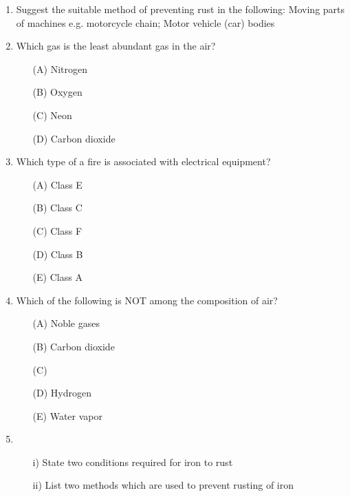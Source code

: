 \begin{enumerate}
	\item Suggest the suitable method of preventing rust in the following: Moving parts of machines e.g. motorcycle chain; Motor vehicle (car) bodies
	
	\item Which gas is the least abundant gas in the air?
		\begin{enumerate}[topsep=0ex,itemsep=0ex,partopsep=1ex,parsep=1ex]
		\item[(A)] Nitrogen
		\item[(B)] Oxygen
		\item[(C)] Neon
		\item[(D)] Carbon dioxide
	\end{enumerate}
	
	\item Which type of a fire is associated with electrical equipment?
	\begin{enumerate}[topsep=0ex,itemsep=0ex,partopsep=1ex,parsep=1ex]
		\item[(A)] Class E
		\item[(B)] Class C
		\item[(C)] Class F
		\item[(D)] Class B
		\item[(E)] Class A
	\end{enumerate}
	
	\item Which of the following is NOT among the composition of air?
	\begin{enumerate}[topsep=0ex,itemsep=0ex,partopsep=1ex,parsep=1ex]
		\item[(A)] Noble gases
		\item[(B)] Carbon dioxide
		\item[(C)] 
		\item[(D)] Hydrogen
		\item[(E)] Water vapor
	\end{enumerate}
	
	\item 
	\begin{enumerate}[topsep=0ex,itemsep=0ex,partopsep=1ex,parsep=1ex]
		\item[i)] State two conditions required for iron to rust
		\item[ii)] List two methods which are used to prevent rusting of iron
	\end{enumerate}
	
\end{enumerate}






















